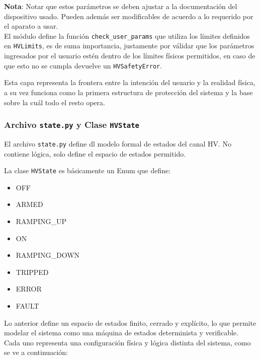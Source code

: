 \documentclass{article}
\begin{document}
\textbf{Nota}: Notar que estos parámetros se deben ajustar a la documentación del dispositivo usado. Pueden además ser modificables de acuerdo a lo requerido por el aparato a usar. \\

El módulo define la función \texttt{check\_user\_params} que utiliza los límites definidos en \texttt{HVLimits}, es de suma importancia, justamente por válidar que los parámetros ingresados por el usuario estén dentro de los límites físicos permitidos, en caso de que esto no se cumpla devuelve un \texttt{HVSafetyError}. 

Esta capa representa la frontera entre la intención del usuario y la realidad física, a su vez funciona como la primera estructura de protección del sistema y la base sobre la cuál todo el resto opera.\\

\subsubsection{Archivo \texttt{state.py} y Clase \texttt{HVState}}

El archivo \texttt{state.py} define dl modelo formal de estados del canal HV. No contiene lógica, solo define el espacio de estados permitido.

La clase \texttt{HVState} es básicamente un Enum que define:
\begin{itemize}
    \item OFF
    \item ARMED
    \item RAMPING\_UP
    \item ON 
    \item RAMPING\_DOWN
    \item TRIPPED
    \item ERROR
    \item FAULT
\end{itemize}
Lo anterior define un espacio de estados finito, cerrado y explícito, lo que permite modelar el sistema como una máquina de estados determinista y verificable.\\

Cada uno representa una configuración física y lógica distinta del sistema, como se ve a continuación:
\end{document}
